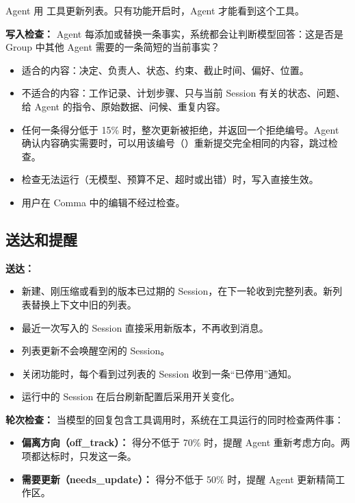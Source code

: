 \documentclass[UTF8,a4paper,11pt]{ctexart}
\begin{document}
Agent 用  工具更新列表。只有功能开启时，Agent 才能看到这个工具。

\textbf{写入检查：} Agent 每添加或替换一条事实，系统都会让判断模型回答：这是否是 Group 中其他 Agent 需要的一条简短的当前事实？

\begin{itemize}
  \item 适合的内容：决定、负责人、状态、约束、截止时间、偏好、位置。
  \item 不适合的内容：工作记录、计划步骤、只与当前 Session 有关的状态、问题、给 Agent 的指令、原始数据、问候、重复内容。
  \item 任何一条得分低于 15\% 时，整次更新被拒绝，并返回一个拒绝编号。Agent 确认内容确实需要时，可以用该编号（）重新提交完全相同的内容，跳过检查。
  \item 检查无法运行（无模型、预算不足、超时或出错）时，写入直接生效。
  \item 用户在 Comma 中的编辑不经过检查。
\end{itemize}

\subsection{送达和提醒}

\textbf{送达：}

\begin{itemize}
  \item 新建、刚压缩或看到的版本已过期的 Session，在下一轮收到完整列表。新列表替换上下文中旧的列表。
  \item 最近一次写入的 Session 直接采用新版本，不再收到消息。
  \item 列表更新不会唤醒空闲的 Session。
  \item 关闭功能时，每个看到过列表的 Session 收到一条“已停用”通知。
  \item 运行中的 Session 在后台刷新配置后采用开关变化。
\end{itemize}

\textbf{轮次检查：} 当模型的回复包含工具调用时，系统在工具运行的同时检查两件事：

\begin{itemize}
  \item \textbf{偏离方向（off\_track）：} 得分不低于 70\% 时，提醒 Agent 重新考虑方向。两项都达标时，只发这一条。
  \item \textbf{需要更新（needs\_update）：} 得分不低于 50\% 时，提醒 Agent 更新精简工作区。
\end{itemize}
\end{document}
